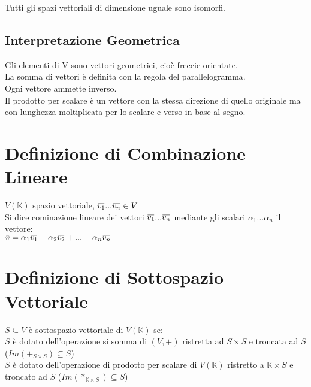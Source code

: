 \documentclass[a4paper, twoside, italian, 11pt]{book}
\newcommand{\overbar}[1]{\mkern 1.5mu\overline{\mkern-1.5mu#1\mkern-1.5mu}\mkern 1.5mu}
\newcommand{\K}{\mathbb{K}}
\begin{document}
\noindent
Tutti gli spazi vettoriali di dimensione uguale sono isomorfi.


\subsection{Interpretazione Geometrica}

Gli elementi di V sono vettori geometrici, cioè freccie orientate. \\
La somma di vettori è definita con la regola del parallelogramma. \\
Ogni vettore ammette inverso. \\
Il prodotto per scalare è un vettore con la stessa direzione di quello originale ma con lunghezza moltiplicata per lo scalare e verso in base al segno. \\





\section{Definizione di Combinazione Lineare}

$V(\K)$ spazio vettoriale, $\overbar{v_1} ... \overbar{v_n} \in V$ \\

\noindent
Si dice cominazione lineare dei vettori $\overbar{v_1} ... \overbar{v_n}$ mediante gli scalari $\alpha_1 ... \alpha_n$ il vettore: \\

$\overbar{v} = \alpha_1 \overbar{v_1} + \alpha_2 \overbar{v_2} + ... + \alpha_n \overbar{v_n}$



\section{Definizione di Sottospazio Vettoriale}

$S \subseteq V$ è sottospazio vettoriale di $V(\K)$ se: \\

\noindent
$S$ è dotato dell'operazione si somma di $(V, +)$ ristretta ad $S \times S$ e troncata ad $S$ ($Im(+_{S \times S}) \subseteq S$)\\

\noindent
$S$ è dotato dell'operazione di prodotto per scalare di $V(\K)$ ristretto a $\K \times S$ e troncato ad $S$ ($Im(*_{\K \times S}) \subseteq S$) \\
\end{document}
